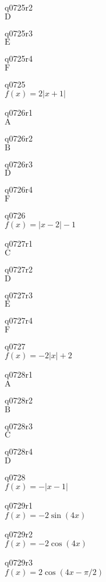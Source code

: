 q0725r2\\
\(\displaystyle \text{D} \)

q0725r3\\
\(\displaystyle \text{E} \)

q0725r4\\
\(\displaystyle \text{F} \)

q0725\\
\(\displaystyle f(x) = 2|x+1| \)

q0726r1\\
\(\displaystyle \text{A} \)

q0726r2\\
\(\displaystyle \text{B} \)

q0726r3\\
\(\displaystyle \text{D} \)

q0726r4\\
\(\displaystyle \text{F} \)

q0726\\
\(\displaystyle f(x) = |x-2| - 1 \)

q0727r1\\
\(\displaystyle \text{C} \)

q0727r2\\
\(\displaystyle \text{D} \)

q0727r3\\
\(\displaystyle \text{E} \)

q0727r4\\
\(\displaystyle \text{F} \)

q0727\\
\(\displaystyle f(x) = -2|x| + 2 \)

q0728r1\\
\(\displaystyle \text{A} \)

q0728r2\\
\(\displaystyle \text{B} \)

q0728r3\\
\(\displaystyle \text{C} \)

q0728r4\\
\(\displaystyle \text{D} \)

q0728\\
\(\displaystyle f(x) = -|x-1| \)

q0729r1\\
\(\displaystyle f(x) = -2\sin(4x) \)

q0729r2\\
\(\displaystyle f(x) = -2\cos(4x) \)

q0729r3\\
\(\displaystyle f(x) = 2\cos(4x - \pi/2) \)

